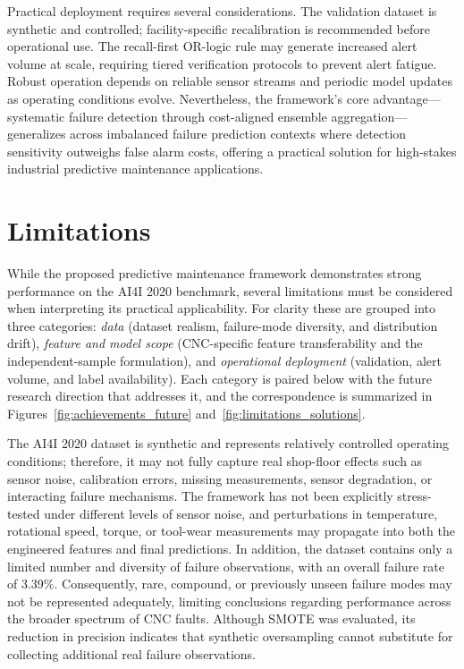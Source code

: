 \documentclass[final,5p, twocolumn]{elsarticle}
\begin{document}
Practical deployment requires several considerations. The validation dataset is synthetic and controlled; facility-specific recalibration is recommended before operational use. The recall-first OR-logic rule may generate increased alert volume at scale, requiring tiered verification protocols to prevent alert fatigue. Robust operation depends on reliable sensor streams and periodic model updates as operating conditions evolve. Nevertheless, the framework's core advantage—systematic failure detection through cost-aligned ensemble aggregation—generalizes across imbalanced failure prediction contexts where detection sensitivity outweighs false alarm costs, offering a practical solution for high-stakes industrial predictive maintenance applications.

\color{blue}

\section{Limitations}\label{sec:limitations}

While the proposed predictive maintenance framework demonstrates strong performance on the AI4I 2020 benchmark, several limitations must be considered when interpreting its practical applicability. For clarity these are grouped into three categories: \textit{data} (dataset realism, failure-mode diversity, and distribution drift), \textit{feature and model scope} (CNC-specific feature transferability and the independent-sample formulation), and \textit{operational deployment} (validation, alert volume, and label availability). Each category is paired below with the future research direction that addresses it, and the correspondence is summarized in Figures~\ref{fig:achievements_future} and~\ref{fig:limitations_solutions}.

The AI4I 2020 dataset is synthetic and represents relatively controlled operating conditions; therefore, it may not fully capture real shop-floor effects such as sensor noise, calibration errors, missing measurements, sensor degradation, or interacting failure mechanisms. The framework has not been explicitly stress-tested under different levels of sensor noise, and perturbations in temperature, rotational speed, torque, or tool-wear measurements may propagate into both the engineered features and final predictions. In addition, the dataset contains only a limited number and diversity of failure observations, with an overall failure rate of 3.39\%. Consequently, rare, compound, or previously unseen failure modes may not be represented adequately, limiting conclusions regarding performance across the broader spectrum of CNC faults. Although SMOTE was evaluated, its reduction in precision indicates that synthetic oversampling cannot substitute for collecting additional real failure observations.
\end{document}
